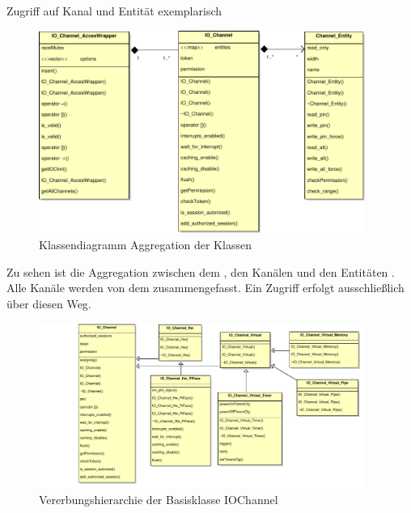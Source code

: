 \begin{listing}[H]
	\inputminted[numbersep=1pt,fontsize=\scriptsize,frame=single, firstline=415,lastline=416]{c}{./code/main-klassenstruktur.cpp}
	\caption{Zugriff auf Kanal und Entität exemplarisch}
	\label{code:chnlAccess}
\end{listing}


\begin{figure}[H]
	\begin{center}
		\includegraphics[width=0.95\textwidth ,clip]{./code/Aggregation.pdf}
		\caption{Klassendiagramm Aggregation der Klassen}
		\label{img:classAgregation}
	\end{center} 
\end{figure}	
Zu sehen ist die Aggregation zwischen dem , den Kanälen  und den Entitäten . Alle Kanäle werden von dem   zusammengefasst. Ein Zugriff erfolgt ausschließlich über diesen Weg. 


\begin{figure}[H]
	\begin{center}
		\includegraphics[width=0.95\textwidth ,clip]{./code/IOChannel.pdf}
		\caption{Vererbungshierarchie der Basisklasse IOChannel}
		\label{img:classIOChannel}
	\end{center} 
\end{figure}	

